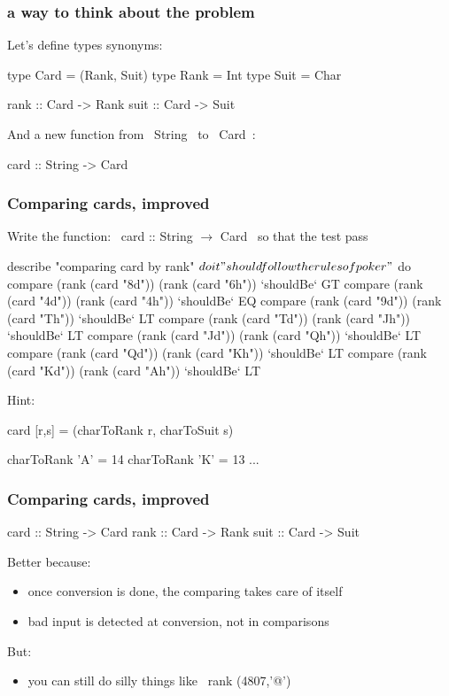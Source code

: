 \documentclass[11pt,xcolor={dvipsnames}]{beamer}
\begin{document}
\begin{frame}[fragile]
\frametitle{a way to think about the problem}
Let's define types synonyms:
\begin{haskell}
type Card = (Rank, Suit) 
type Rank = Int
type Suit = Char

rank :: Card -> Rank
suit :: Card -> Suit
\end{haskell}
And a new function from ~String~ to ~Card~:
\begin{haskell}
card :: String -> Card
\end{haskell}
\end{frame}
\begin{frame}[fragile]
\frametitle{Comparing cards, improved}
Write the function: ~card :: String $\rightarrow$ Card~ 
so that the test pass
\begin{hspec}
describe "comparing card by rank" $ do
    it "should follow the rules of poker" $ do
        compare (rank (card "8d")) (rank (card "6h")) `shouldBe` GT
        compare (rank (card "4d")) (rank (card "4h")) `shouldBe` EQ
        compare (rank (card "9d")) (rank (card "Th")) `shouldBe` LT 
        compare (rank (card "Td")) (rank (card "Jh")) `shouldBe` LT 
        compare (rank (card "Jd")) (rank (card "Qh")) `shouldBe` LT 
        compare (rank (card "Qd")) (rank (card "Kh")) `shouldBe` LT 
        compare (rank (card "Kd")) (rank (card "Ah")) `shouldBe` LT 
\end{hspec}
Hint:
\begin{haskell}
card [r,s] = (charToRank r, charToSuit s)

charToRank 'A' = 14
charToRank 'K' = 13
...
\end{haskell}
\end{frame}
\begin{frame}[fragile]
\frametitle{Comparing cards, improved}
\begin{haskell}
card :: String -> Card
rank :: Card -> Rank
suit :: Card -> Suit
\end{haskell}
Better because:
\begin{itemize}
\item  once conversion is done, the comparing takes care of itself
\item  bad input is detected at conversion, not in comparisons
\end{itemize}
But:
\begin{itemize}
\item  you can still do silly things like ~rank (4807,'@')~ 
\end{itemize}
\end{frame}
\end{document}
